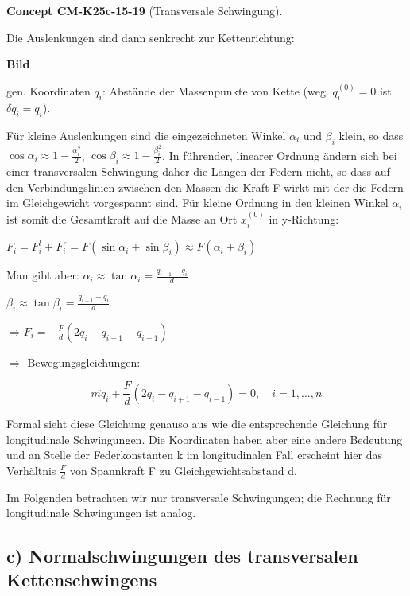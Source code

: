 \documentclass[10pt, letterpaper]{article}
\newcommand{\CustomHeading}[3]{%
  \par\medskip\noindent%
  \textbf{#1 #2} \textnormal{(#3)}.\enskip%
}
\newenvironment{CONC}[2]{\begin{unitbox}\CustomHeading{Concept}{#1}{#2}}{\end{unitbox}}
\begin{document}
\begin{CONC}{CM-K25c-15-19}{Transversale Schwingung}
Die Auslenkungen sind dann senkrecht zur Kettenrichtung:

\textbf{Bild}

gen. Koordinaten $q_i$: Abstände der Massenpunkte von Kette
(weg. $q_i^{(0)} = 0$ ist $\delta q_i = q_i$).

Für kleine Auslenkungen sind die eingezeichneten Winkel $\alpha_i$ und
$\beta_i$ klein, so dass $\cos\alpha_i \approx 1- \frac{\alpha_i^2}{2}$, $\cos\beta_i \approx 1- \frac{\beta_i^2}{2}$.
In führender, linearer Ordnung ändern sich bei einer transversalen
Schwingung daher die Längen der Federn nicht, so dass auf
den Verbindungslinien zwischen den Massen die Kraft F wirkt
mit der die Federn im Gleichgewicht vorgespannt sind.
Für kleine Ordnung in den kleinen Winkel $\alpha_i$ ist somit die Gesamtkraft auf die Masse an Ort $x_i^{(0)}$ in y-Richtung:

$F_i = F_i^l + F_i^r = F(\sin \alpha_i + \sin \beta_i) \approx F(\alpha_i + \beta_i)$

Man gibt aber: $\alpha_i \approx \tan \alpha_i = \frac{q_{i-1}-q_i}{d}$

$\beta_i \approx \tan \beta_i = \frac{q_{i+1}-q_i}{d}$

$\Rightarrow F_i = -\frac{F}{d}(2q_i - q_{i+1} - q_{i-1})$

$\Rightarrow$ Bewegungsgleichungen:

\begin{equation}
m\ddot{q}_i + \frac{F}{d}(2q_i - q_{i+1} - q_{i-1}) = 0, \quad i=1,...,n
\end{equation}

Formal sieht diese Gleichung genauso aus wie die entsprechende Gleichung für longitudinale Schwingungen. Die Koordinaten haben aber eine andere Bedeutung und an Stelle der Federkonstanten k im longitudinalen Fall erscheint hier das Verhältnis $\frac{F}{d}$ von Spannkraft F zu Gleichgewichtsabstand d.
\end{CONC}

Im Folgenden betrachten wir nur transversale Schwingungen; die Rechnung für longitudinale Schwingungen ist analog.



\subsection*{c) Normalschwingungen des transversalen Kettenschwingens}
\end{document}
